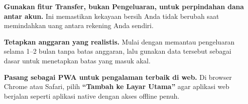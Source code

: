 \documentclass[12pt, a4paper]{article}
\begin{document}
\begin{tipbox}
\textbf{Gunakan fitur Transfer, bukan Pengeluaran, untuk perpindahan dana antar akun.} Ini memastikan kekayaan bersih Anda tidak berubah saat memindahkan uang antara rekening Anda sendiri.
\end{tipbox}

\begin{tipbox}
\textbf{Tetapkan anggaran yang realistis.} Mulai dengan memantau pengeluaran selama 1--2 bulan tanpa batas anggaran, lalu gunakan data tersebut sebagai dasar untuk menetapkan batas yang masuk akal.
\end{tipbox}

\begin{tipbox}
\textbf{Pasang sebagai PWA untuk pengalaman terbaik di web.} Di browser Chrome atau Safari, pilih \textbf{``Tambah ke Layar Utama''} agar aplikasi web berjalan seperti aplikasi native dengan akses offline penuh.
\end{tipbox}
\end{document}

